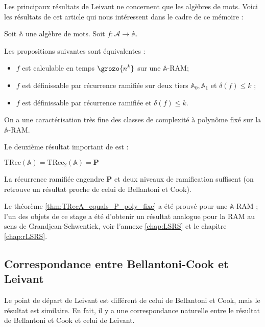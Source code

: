 \documentclass{report}
\newcommand{\bbA}{\mathbb{A}}
\newcommand{\TRec}[1]{\text{TRec}\left(\mathbb{#1}\right)}
\newcommand{\TRecd}[1]{\text{TRec}_{2}\left(\mathbb{#1}\right)}
\begin{document}
			\espace
			
			Les principaux résultats de Leivant ne concernent que les algèbres de mots. Voici les résultats de cet article \cite{Leivant1995} qui nous intéressent dans le cadre de ce mémoire :
			
			\begin{theorem}
				\label{thm:TRecA_equals_P_poly_fixe}
				Soit $\bbA$ une algèbre de mots. Soit $f : \mathcal{A} \to \bbA $.
				
				Les propositions suivantes sont équivalentes :
	
				\begin{itemize}[itemsep=-1mm]
					\item 	$f$ est calculable en temps $\grozo{n^k}$ sur une $\bbA$-RAM;
					\item 	$f$ est définissable par récurrence ramifiée sur deux tiers $\bbA_0, \bbA_1$ et $\delta(f) \leq k$ ;
					\item 	$f$ est définissable par récurrence ramifiée et $\delta(f) \leq k$.
				\end{itemize}
			\end{theorem}
			
			On a une caractérisation très fine des classes de complexité à polynôme fixé sur la $\bbA$-RAM.
			
			Le deuxième résultat important de \cite{Leivant1995} est :
			
			\begin{theorem}
				\label{thm:TRecA_equals_P}
				$\TRec{A} = \TRecd{A} = \textbf{P}$
			\end{theorem}
			
			La récurrence ramifiée engendre $\textbf{P}$ et deux niveaux de ramification suffisent (on retrouve un résultat proche de celui de Bellantoni et Cook).
		
			Le théorème \ref{thm:TRecA_equals_P_poly_fixe} a été prouvé pour une $\bbA$-RAM ; l'un des objets de ce stage a été d'obtenir un résultat analogue pour la RAM au sens de Grandjean-Schwentick, voir l'annexe \ref{chap:LSRS} et le chapitre \ref{chap:rLSRS}.
			
		
	
		\subsection{Correspondance entre Bellantoni-Cook et Leivant}
		\label{subsec:corres_BC_Leivant}
	
			Le point de départ de Leivant est différent de celui de Bellantoni et Cook, mais le résultat est similaire. En fait, il y a une correspondance naturelle entre le résultat de Bellantoni et Cook et celui de Leivant.
			
\end{document}
